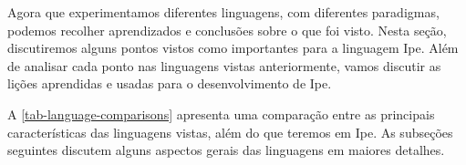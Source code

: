 Agora que experimentamos diferentes linguagens, com diferentes paradigmas, podemos
recolher aprendizados e conclusões sobre o que foi visto. Nesta seção, discutiremos
alguns pontos vistos como importantes para a linguagem Ipe. Além de analisar cada
ponto nas linguagens vistas anteriormente, vamos discutir as lições aprendidas e
usadas para o desenvolvimento de Ipe.

A \autoref{tab-language-comparisons} apresenta uma comparação entre as
principais características das linguagens vistas, além do que teremos em Ipe. As
subseções seguintes discutem alguns aspectos gerais das linguagens em maiores detalhes.

\begin{table}[htb]
  \caption{Principais características das linguagens analisadas e de Ipe}
  \label{tab-language-comparisons}
\end{table}

